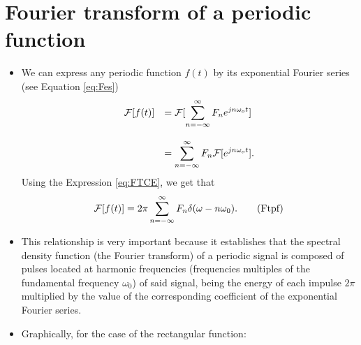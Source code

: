 \section{Fourier transform of a periodic function}
\begin{itemize}
\item We can express any periodic function $f(t)$ by its exponential
  Fourier series (see Equation \ref{eq:Fes})
  \begin{displaymath}
    \begin{array}{rl}
      {\cal F}[f(t)] & = {\cal F}[\displaystyle\sum_{n=-\infty}^\infty F_n
      e^{jn\omega_ot}]\\\\
      & = \displaystyle\sum_{n=-\infty}^\infty F_n{\cal F}[e^{jn\omega_ot}].
    \end{array}
  \end{displaymath}
  Using the Expression \ref{eq:FTCE}, we get that
  \begin{equation}
    {\cal F}[f(t)] = 2\pi\sum_{n=-\infty}^\infty F_n\delta(\omega-n\omega_0).
    \tag{Ftpf}
    \label{eq:TFfp}
  \end{equation}

\item This relationship is very important because it establishes that
  the spectral density function (the Fourier transform) of a periodic
  signal is composed of pulses located at harmonic frequencies
  (frequencies multiples of the fundamental frequency $\omega_0$) of said
  signal, being the energy of each impulse $2\pi$ multiplied by the
  value of the corresponding coefficient of the exponential Fourier
  series.

\item Graphically, for the case of the rectangular function:
\end{itemize}

